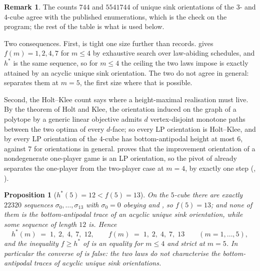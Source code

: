 \documentclass[11pt]{article}
\theoremstyle{plain}
\newtheorem{proposition}[theorem]{Proposition}
\theoremstyle{definition}
\newtheorem{remark}[theorem]{Remark}
\begin{document}
\begin{remark}\label{rem:auso-census}
The counts $744$ and $5541744$ of unique sink orientations of the $3$- and
$4$-cube agree with the published enumerations, which is the check on the
program; the rest of the table is what is used below.

Two consequences. First,  is tight one size further than
 records.  gives $f(m)=1,2,4,7$ for
$m\le4$ by exhaustive search over law-abiding schedules, and $h^{\ast}$ is the
same sequence, so for $m\le4$ the ceiling the two laws impose is exactly attained
by an acyclic unique sink orientation. The two do not agree in general:
 separates them at $m=5$, the first size where that is
possible.

Second, the Holt--Klee count says where a height-maximal realisation must live.
By the theorem of Holt and Klee, the orientation induced on the graph of a
polytope by a generic linear objective admits $d$ vertex-disjoint monotone paths
between the two optima of every $d$-face; so every LP orientation is Holt--Klee,
and by  every LP orientation of the $4$-cube has
bottom-antipodal height at most $6$, against $7$ for orientations in general.
 proves that the improvement orientation of a nondegenerate one-player game is an LP orientation, so the pivot of  already separates the one-player from the two-player case at $m=4$, by exactly one step (, ).
\end{remark}

\begin{proposition}[$h^{\ast}(5)=12<f(5)=13$]\label{prop:hstar-five}
On the $5$-cube there are exactly $22320$ sequences $\sigma_0,\dots,\sigma_{13}$
with $\sigma_0=0$ obeying  and , so
$f(5)=13$; and none of them is the bottom-antipodal trace of an acyclic unique
sink orientation, while some sequence of length $12$ is. Hence
\[
  h^{\ast}(m)\;=\;1,\;2,\;4,\;7,\;12,\qquad
  f(m)\;=\;1,\;2,\;4,\;7,\;13\qquad(m=1,\dots,5),
\]
and the inequality $f\ge h^{\ast}$ of  is an equality for
$m\le4$ and strict at $m=5$. In particular the converse of
 is false: the two laws do not characterise the
bottom-antipodal traces of acyclic unique sink orientations.
\end{proposition}
\end{document}
